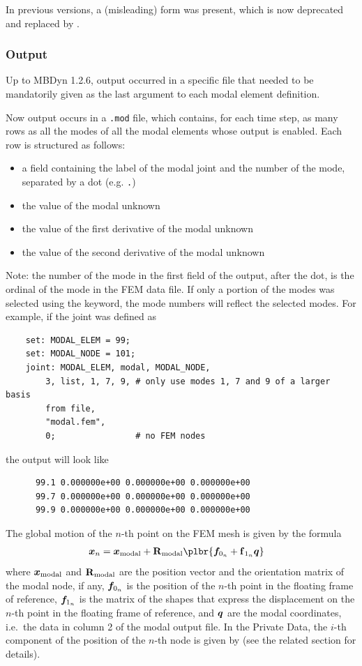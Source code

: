 In previous versions, a (misleading)  form
was present, which is now deprecated and replaced by .



\subsubsection{Output}
Up to MBDyn 1.2.6, output occurred in a specific file that needed
to be mandatorily given as the last argument to each modal element
definition.

Now output occurs in a \texttt{.mod} file, which contains, for each time step,
as many rows as all the modes of all the modal elements whose output is enabled.
Each row is structured as follows:
\begin{itemize}
\item a field containing the label of the modal joint and the number of the mode,
separated by a dot (e.g. \texttt{.})
\item the value of the modal unknown
\item the value of the first derivative of the modal unknown
\item the value of the second derivative of the modal unknown
\end{itemize}
Note: the number of the mode in the first field of the output, after the dot,
is the ordinal of the mode in the FEM data file.
If only a portion of the modes was selected using the  keyword,
the mode numbers will reflect the selected modes.
For example, if the  joint was defined as
\begin{verbatim}
    set: MODAL_ELEM = 99;
    set: MODAL_NODE = 101;
    joint: MODAL_ELEM, modal, MODAL_NODE,
        3, list, 1, 7, 9, # only use modes 1, 7 and 9 of a larger basis
        from file,
        "modal.fem",
        0;                # no FEM nodes
\end{verbatim}
the output will look like
\begin{verbatim}
      99.1 0.000000e+00 0.000000e+00 0.000000e+00
      99.7 0.000000e+00 0.000000e+00 0.000000e+00
      99.9 0.000000e+00 0.000000e+00 0.000000e+00
\end{verbatim}
The global motion of the $n$-th point on the FEM mesh is given by the formula
\begin{align}
	\T{x}_n
	&=
	\T{x}_\text{modal}
	+
	\TT{R}_\text{modal} \plbr{
		\T{f}_{0_n}
		+
		\TT{f}_{1_n} \T{q}
	}
\end{align}
where $\boldsymbol{x}_\text{modal}$ and $\bm{\mathbf R}_\text{modal}$
are the position vector and the orientation matrix of the modal node, if any,
$\boldsymbol{f}_{0_n}$ is the position of the $n$-th point in the floating frame of reference,
$\boldsymbol{f}_{1_n}$ is the matrix of the shapes that express the displacement on the $n$-th point
in the floating frame of reference, and $\boldsymbol{q}$ are the modal coordinates,
i.e.\ the data in column 2 of the modal output file.
In the Private Data, the $i$-th component of the position of the $n$-th node
is given by  (see the related section for details).



